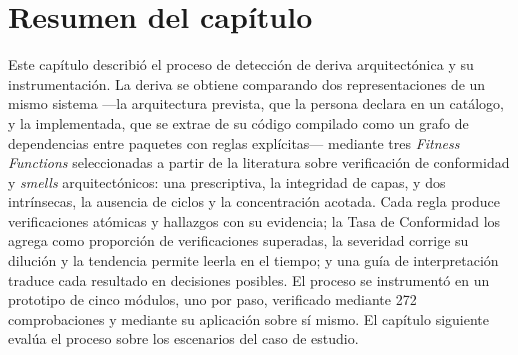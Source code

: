 \section{Resumen del capítulo}
Este capítulo describió el proceso de detección de deriva arquitectónica y su instrumentación. La deriva se obtiene comparando dos representaciones de un mismo sistema ---la arquitectura prevista, que la persona declara en un catálogo, y la implementada, que se extrae de su código compilado como un grafo de dependencias entre paquetes con reglas explícitas--- mediante tres \textit{Fitness Functions} seleccionadas a partir de la literatura sobre verificación de conformidad y \textit{smells} arquitectónicos: una prescriptiva, la integridad de capas, y dos intrínsecas, la ausencia de ciclos y la concentración acotada. Cada regla produce verificaciones atómicas y hallazgos con su evidencia; la Tasa de Conformidad los agrega como proporción de verificaciones superadas, la severidad corrige su dilución y la tendencia permite leerla en el tiempo; y una guía de interpretación traduce cada resultado en decisiones posibles. El proceso se instrumentó en un prototipo de cinco módulos, uno por paso, verificado mediante 272 comprobaciones y mediante su aplicación sobre sí mismo. El capítulo siguiente evalúa el proceso sobre los escenarios del caso de estudio.
